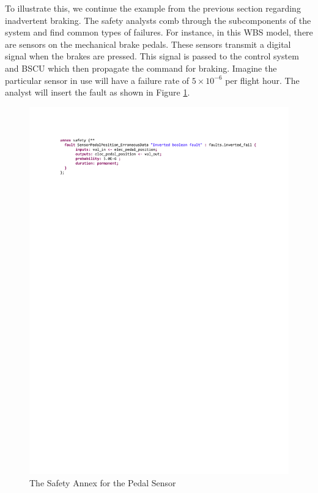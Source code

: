 To illustrate this, we continue the example from the previous section regarding inadvertent braking. The safety analysts comb through the subcomponents of the system and find common types of failures. For instance, in this WBS model, there are sensors on the mechanical brake pedals. These sensors transmit a digital signal when the brakes are pressed. This signal is passed to the control system and BSCU which then propagate the command for braking. Imagine the particular sensor in use will have a failure rate of $5 \times 10^{-6}$ per flight hour. The analyst will insert the fault as shown in Figure \ref{fig:sensorFault}. 

\begin{figure}[h!]
	\hspace*{-2cm}
	\vspace{-0.5in} 
	\begin{center}
		\includegraphics[trim=0 680 -10 70,clip,width=1.5\dimexpr\textwidth-2cm\relax]{images/safetyannex_sensorfault.pdf}
		\caption{The Safety Annex for the Pedal Sensor}
		\label{fig:sensorFault}
	\end{center}
	\vspace{-0.3in}
\end{figure}

